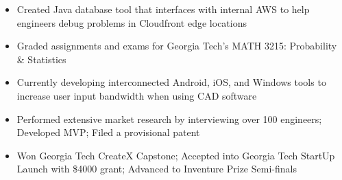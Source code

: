 \documentclass[10pt,letter,ragged2e,withhyper]{altacv}
\begin{document}
\begin{paracol}{2}




\begin{itemize}
\item Created Java database tool that interfaces with internal AWS to help engineers debug problems in Cloudfront edge locations
\end{itemize}

\divider

\begin{itemize}
\item Graded assignments and exams for Georgia Tech’s MATH 3215: Probability \& Statistics
\end{itemize}




\begin{itemize}
\item Currently developing interconnected Android, iOS, and Windows tools to increase user input bandwidth when using CAD software
\item Performed extensive market research by interviewing over 100 engineers; Developed MVP; Filed a provisional patent
\item Won Georgia Tech CreateX Capstone; Accepted into Georgia Tech StartUp Launch with \$4000 grant; Advanced to Inventure Prize Semi-finals
\end{itemize}


\end{paracol}
\end{document}
